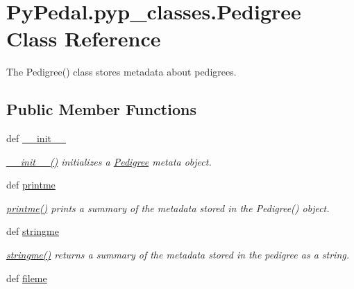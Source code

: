 \hypertarget{classPyPedal_1_1pyp__classes_1_1Pedigree}{
\section{PyPedal.pyp\_\-classes.Pedigree Class Reference}
\label{classPyPedal_1_1pyp__classes_1_1Pedigree}
}


The Pedigree() class stores metadata about pedigrees.  


\subsection*{Public Member Functions}
\begin{DoxyCompactItemize}
\item 
def \hyperlink{classPyPedal_1_1pyp__classes_1_1Pedigree_ade39878cc44e604f0d2f1023a9014518}{\_\-\_\-init\_\-\_\-}
\begin{DoxyCompactList}\small\item\em \hyperlink{classPyPedal_1_1pyp__classes_1_1Pedigree_ade39878cc44e604f0d2f1023a9014518}{\_\-\_\-init\_\-\_\-()} initializes a \hyperlink{classPyPedal_1_1pyp__classes_1_1Pedigree}{Pedigree} metata object. \item\end{DoxyCompactList}\item 
def \hyperlink{classPyPedal_1_1pyp__classes_1_1Pedigree_ab8c2b67da1b07fedf79d997172b72a03}{printme}
\begin{DoxyCompactList}\small\item\em \hyperlink{classPyPedal_1_1pyp__classes_1_1Pedigree_ab8c2b67da1b07fedf79d997172b72a03}{printme()} prints a summary of the metadata stored in the Pedigree() object. \item\end{DoxyCompactList}\item 
def \hyperlink{classPyPedal_1_1pyp__classes_1_1Pedigree_ac4a0cad61344517ea9a1b00b6f1ee007}{stringme}
\begin{DoxyCompactList}\small\item\em \hyperlink{classPyPedal_1_1pyp__classes_1_1Pedigree_ac4a0cad61344517ea9a1b00b6f1ee007}{stringme()} returns a summary of the metadata stored in the pedigree as a string. \item\end{DoxyCompactList}\item 
def \hyperlink{classPyPedal_1_1pyp__classes_1_1Pedigree_a009aa82eb9e76635475f092c269a719f}{fileme}

\end{DoxyCompactItemize}
